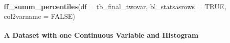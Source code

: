 \documentclass[
]{book}
\newenvironment{Shaded}{\begin{snugshade}}{\end{snugshade}}
\newcommand{\DataTypeTok}[1]{\textcolor[rgb]{0.13,0.29,0.53}{#1}}
\newcommand{\KeywordTok}[1]{\textcolor[rgb]{0.13,0.29,0.53}{\textbf{#1}}}
\newcommand{\NormalTok}[1]{#1}
\newcommand{\OtherTok}[1]{\textcolor[rgb]{0.56,0.35,0.01}{#1}}
\begin{document}
\begin{Shaded}
\begin{Highlighting}[]
\KeywordTok{ff_summ_percentiles}\NormalTok{(}\DataTypeTok{df =}\NormalTok{ tb_final_twovar, }\DataTypeTok{bl_statsasrows =} \OtherTok{TRUE}\NormalTok{, }\DataTypeTok{col2varname =} \OtherTok{FALSE}\NormalTok{)}
\end{Highlighting}
\end{Shaded}

\hypertarget{a-dataset-with-one-continuous-variable-and-histogram}{%
\paragraph{A Dataset with one Continuous Variable and Histogram}\label{a-dataset-with-one-continuous-variable-and-histogram}}
\end{document}
